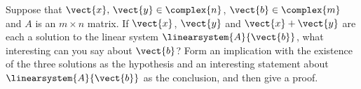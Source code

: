 Suppose that $\vect{x},\,\vect{y}\in\complex{n}$, $\vect{b}\in\complex{m}$ and $A$ is an $m\times n$ matrix.  If $\vect{x}$, $\vect{y}$ and $\vect{x}+\vect{y}$ are each a solution to the linear system $\linearsystem{A}{\vect{b}}$, what interesting can you say about $\vect{b}$?  Form an implication with the existence of the three solutions as the hypothesis and an interesting statement about $\linearsystem{A}{\vect{b}}$ as the conclusion, and then give a proof. 